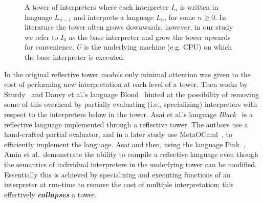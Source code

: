 \documentclass[sigplan,anonymous,review]{acmart}
\theoremstyle{definition}
\begin{document}
\begin{figure}[t]
    \centering
    \caption{A tower of interpreters where each interpreter $I_n$ is written in language $L_{n-1}$ and interprets a language $L_n$, for some $n \geq 0$. In literature the tower often grows downwards, however, in our study we refer to $I_0$ as the base interpreter and grow the tower upwards for convenience. $U$ is the underlying machine (e.g. CPU) on which the base interpreter is executed.}
    \label{fig:tombstone_tower_ex1}
\end{figure}

In the original reflective tower models only minimal attention was given to the cost of performing new interpretation at each level of a tower. Then works by Sturdy~\cite{sturdy1993lisp} and Danvy et al.'s language Blond~\cite{danvy1988intensions} hinted at the possibility of removing some of this overhead by partially evaluating (i.e., specializing) interpreters with respect to the interpreters below in the tower. Asai et al.'s language \textit{Black}~\cite{asai1996duplication} is a reflective language implemented through a reflective tower. The authors use a hand-crafted partial evaluator, and in a later study use MetaOCaml~\cite{asai2015compiling}, to efficiently implement the language. Asai and then, using the language Pink~\cite{amin2017collapsing}, Amin et al.~demonstrate the ability to compile a reflective language even though the semantics of individual interpreters in the underlying tower can be modified. Essentially this is achieved by specializing and executing functions of an interpreter at run-time to remove the cost of multiple interpretation; this effectively \textbf{\textit{collapses}} a tower.
\end{document}

